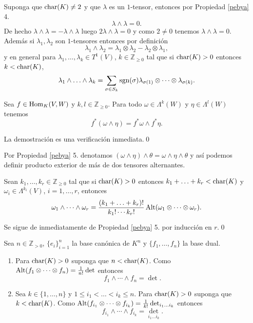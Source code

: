 \begin{obs}\label{pe0}
Suponga que $\operatorname{char}(K)\ne 2$ y que $\lambda$ es un $1$-tensor, entonces por Propiedad \ref{pebya} 4. $$\lambda\wedge\lambda=0.$$
De hecho $\lambda\wedge\lambda=-\lambda\wedge\lambda$ luego $2\lambda\wedge\lambda=0$ y como $2\ne 0$ tenemos $\lambda\wedge\lambda=0$. Adem\'as si $\lambda_1,\lambda_2$ son $1$-tensores entonces por definici\'on
$$\lambda_1\wedge\lambda_2=\lambda_1\otimes\lambda_2-\lambda_2\otimes\lambda_1,$$
y en general para $\lambda_1,\ldots,\lambda_k\in T^1(V)$, $k\in\mathbb{Z}_{\ge 0}$ tal que si $\operatorname{char}(K)>0$ entonces $k<\operatorname{char}(K)$,
$$\lambda_1\wedge\ldots\wedge\lambda_k=\sum_{\sigma\in S_k} \operatorname{sgn}(\sigma)\lambda_{\sigma(1)}\otimes\cdots\otimes\lambda_{\sigma(k)}.$$
\end{obs}

\begin{prop}
Sea $f\in\operatorname{Hom}_K(V,W)$ y $k,l\in\mathbb{Z}_{\ge 0}$. Para todo $\omega\in \Lambda^k(W)$ y $\eta\in \Lambda^l(W)$ tenemos
$$f^*(\omega\wedge \eta)=f^*\omega\wedge f^*\eta.$$
\end{prop}

\dem La demostraci\'on es una verificaci\'on inmediata.\qed

\begin{nota}
Por Propiedad \ref{pebya} 5. denotamos $(\omega\wedge\eta)\wedge\theta=\omega\wedge\eta\wedge\theta$ y as\'i podemos definir producto exterior de m\'as de dos tensores alternantes.
\end{nota}

\begin{coro}
Sean $k_1,\ldots,k_r\in\mathbb{Z}_{\ge 0}$ tal que si $\operatorname{char}(K)>0$ entonces $k_1+\ldots+k_r<\operatorname{char}(K)$ y $\omega_i\in\Lambda^{k_i}(V)$, $i=1,\ldots,r$, entonces
$$\omega_1\wedge\cdots\wedge\omega_r=\dfrac{(k_1+\ldots+k_r)!}{k_1!\cdots k_r!}\operatorname{Alt}(\omega_1\otimes\cdots\otimes\omega_r).$$
\end{coro}

\dem Se sigue de inmediatamente de Propiedad \ref{pebya} 5. por inducci\'on en $r$.\qed

\begin{ejem}\label{peej} Sea $n\in\mathbb{Z}_{>0}$, $\{e_i\}_{i=1}^n$ la base can\'onica de $K^n$ y $\{f_1,\ldots,f_n\}$ la base dual.
\begin{enumerate}
\item Para $\operatorname{char}(K)>0$ suponga que $n<\operatorname{char}(K)$. Como $\operatorname{Alt}(f_1\otimes\cdots\otimes f_n)=\frac{1}{n!}\det$ entonces
$$f_1\wedge\cdots\wedge f_n=\det.$$
\item Sea $k\in\{1,\ldots,n\}$ y $1\le i_1<\ldots<i_k\le n$. Para $\operatorname{char}(K)>0$ suponga que $k<\operatorname{char}(K)$. Como $\operatorname{Alt}(f_{i_1}\otimes\cdots\otimes f_{i_k})=\frac{1}{k!}\det_{i_1\ldots i_k}$ entonces
$$f_{i_1}\wedge\cdots\wedge f_{i_k}=\det_{i_1\ldots i_k}.$$
\end{enumerate}
\end{ejem}

